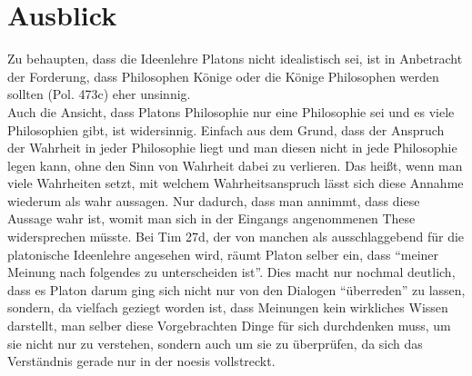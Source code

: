 \documentclass[12pt]{article}
\begin{document}


\section{Ausblick}
Zu behaupten, dass die Ideenlehre Platons nicht idealistisch sei, ist in Anbetracht der Forderung, dass Philosophen Könige oder die Könige Philosophen werden sollten (Pol. 473c) eher unsinnig.\\
Auch die Ansicht, dass Platons Philosophie nur eine Philosophie sei und es viele Philosophien gibt, ist widersinnig. Einfach aus dem Grund, dass der Anspruch der Wahrheit in jeder Philosophie liegt und man diesen nicht in jede Philosophie legen kann, ohne den Sinn von Wahrheit dabei zu verlieren. Das heißt, wenn man viele Wahrheiten setzt, mit welchem Wahrheitsanspruch lässt sich diese Annahme wiederum als wahr aussagen. Nur dadurch, dass man annimmt, dass diese Aussage wahr ist, womit man sich in der Eingangs angenommenen These widersprechen müsste.
Bei Tim 27d, der von manchen als ausschlaggebend für die platonische Ideenlehre angesehen wird, räumt Platon selber ein, dass \enquote{meiner Meinung nach folgendes zu unterscheiden ist}. Dies macht nur nochmal deutlich, dass es Platon darum ging sich nicht nur von den Dialogen \enquote{überreden} zu lassen, sondern, da vielfach geziegt worden ist, dass Meinungen kein wirkliches Wissen darstellt, man selber diese Vorgebrachten Dinge für sich durchdenken muss, um sie nicht nur zu verstehen, sondern auch um sie zu überprüfen, da sich das Verständnis gerade nur in der noesis vollstreckt.   
\end{document}
